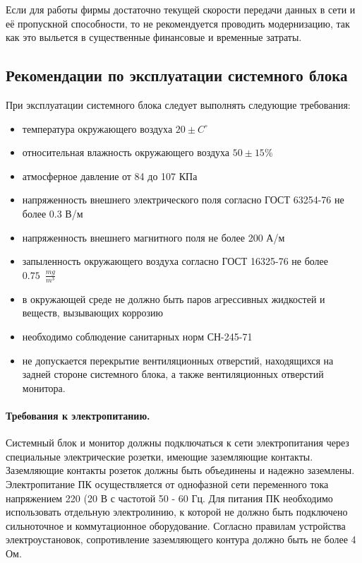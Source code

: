 \documentclass[russian,utf8,emptystyle]{eskdtext}
\begin{document}
Если для работы фирмы достаточно текущей скорости передачи данных в сети и её пропускной способности, то не рекомендуется проводить модернизацию, так как это выльется в существенные финансовые и временные затраты.

\subsection{Рекомендации по эксплуатации системного блока}
При эксплуатации системного блока следует выполнять следующие требования:
\begin{itemize}[label=-]
\item температура окружающего воздуха $20 \pm C^\circ$
\item относительная влажность окружающего воздуха $50 \pm 15\%$
\item атмосферное давление от 84 до 107 КПа
\item напряженность внешнего электрического поля согласно ГОСТ 63254-76 не более 0.3 В/м
\item напряженность внешнего магнитного поля не более 200 А/м
\item запыленность окружающего воздуха согласно ГОСТ 16325-76 не более $0.75 \; \ \frac{mg}{m^3}$
\item в окружающей среде не должно быть паров агрессивных жидкостей и веществ, вызывающих коррозию
\item необходимо соблюдение санитарных норм СН-245-71
\item не допускается перекрытие вентиляционных отверстий, находящихся на задней стороне системного блока, а также вентиляционных отверстий монитора.
\end{itemize}

\paragraph{Требования к электропитанию.}

Системный блок и монитор должны подключаться к сети электропитания через специальные электрические розетки, имеющие заземляющие контакты. Заземляющие контакты розеток должны быть объединены и надежно заземлены.
Электропитание ПК осуществляется от однофазной сети переменного тока напряжением 220 (20 В с частотой 50 - 60 Гц. Для     питания     ПК     необходимо     использовать     отдельную электролинию, к которой не должно быть подключено сильноточное и коммутационное оборудование. Согласно правилам устройства электроустановок, сопротивление заземляющего контура должно быть не более 4 Ом.
\end{document}

